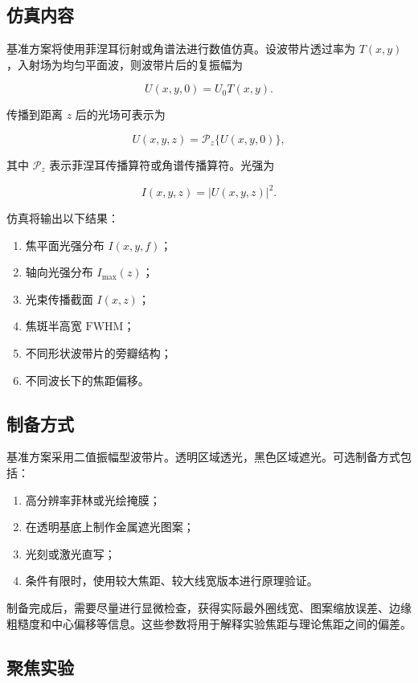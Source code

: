 \documentclass[UTF8,a4paper,11pt]{ctexart}
\begin{document}
\subsection{仿真内容}

基准方案将使用菲涅耳衍射或角谱法进行数值仿真。设波带片透过率为 $T(x,y)$，入射场为均匀平面波，则波带片后的复振幅为

\[
U(x,y,0)=U_0T(x,y).
\]

传播到距离 $z$ 后的光场可表示为

\[
U(x,y,z)=\mathcal{P}_z\{U(x,y,0)\},
\]

其中 $\mathcal{P}_z$ 表示菲涅耳传播算符或角谱传播算符。光强为

\[
I(x,y,z)=|U(x,y,z)|^2.
\]

仿真将输出以下结果：

\begin{enumerate}[label=(\arabic*)]
\item 焦平面光强分布 $I(x,y,f)$；
\item 轴向光强分布 $I_{\max}(z)$；
\item 光束传播截面 $I(x,z)$；
\item 焦斑半高宽 $\mathrm{FWHM}$；
\item 不同形状波带片的旁瓣结构；
\item 不同波长下的焦距偏移。
\end{enumerate}

\subsection{制备方式}

基准方案采用二值振幅型波带片。透明区域透光，黑色区域遮光。可选制备方式包括：

\begin{enumerate}[label=(\arabic*)]
\item 高分辨率菲林或光绘掩膜；
\item 在透明基底上制作金属遮光图案；
\item 光刻或激光直写；
\item 条件有限时，使用较大焦距、较大线宽版本进行原理验证。
\end{enumerate}

制备完成后，需要尽量进行显微检查，获得实际最外圈线宽、图案缩放误差、边缘粗糙度和中心偏移等信息。这些参数将用于解释实验焦距与理论焦距之间的偏差。

\subsection{聚焦实验}
\end{document}
